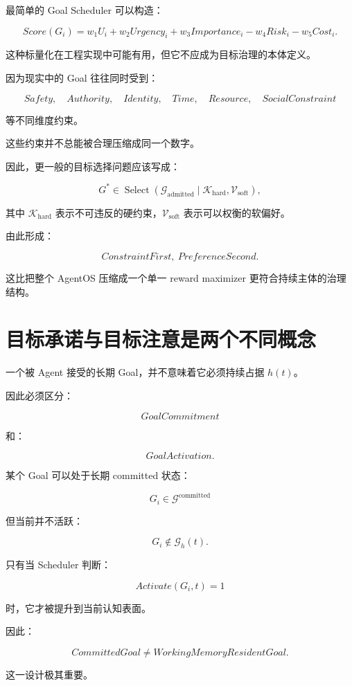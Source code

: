 最简单的 Goal Scheduler 可以构造：

\[
Score(G_i)
=
w_1U_i
+
w_2Urgency_i
+
w_3Importance_i
-
w_4Risk_i
-
w_5Cost_i.
\]

这种标量化在工程实现中可能有用，但它不应成为目标治理的本体定义。

因为现实中的 Goal 往往同时受到：

\[
Safety,
\quad
Authority,
\quad
Identity,
\quad
Time,
\quad
Resource,
\quad
SocialConstraint
\]

等不同维度约束。

这些约束并不总能被合理压缩成同一个数字。

因此，更一般的目标选择问题应该写成：

\[
\boxed{
G^*
\in
\operatorname{Select}
\left(
\mathcal G_{\mathrm{admitted}}
\mid
\mathcal K_{\mathrm{hard}},
\mathcal V_{\mathrm{soft}}
\right),
}
\]

其中 $\mathcal K_{\mathrm{hard}}$ 表示不可违反的硬约束，$\mathcal V_{\mathrm{soft}}$ 表示可以权衡的软偏好。

由此形成：

\[
\boxed{
Constraint First,\ Preference Second.
}
\]

这比把整个 AgentOS 压缩成一个单一 reward maximizer 更符合持续主体的治理结构。


\section{目标承诺与目标注意是两个不同概念}

一个被 Agent 接受的长期 Goal，并不意味着它必须持续占据 $h(t)$。

因此必须区分：

\[
\boxed{
GoalCommitment
}
\]

和：

\[
\boxed{
GoalActivation.
}
\]

某个 Goal 可以处于长期 committed 状态：

\[
G_i\in\mathcal G^{\mathrm{committed}}
\]

但当前并不活跃：

\[
G_i\notin\mathcal G_h(t).
\]

只有当 Scheduler 判断：

\[
Activate(G_i,t)=1
\]

时，它才被提升到当前认知表面。

因此：

\[
\boxed{
CommittedGoal
\neq
WorkingMemoryResidentGoal.
}
\]

这一设计极其重要。

